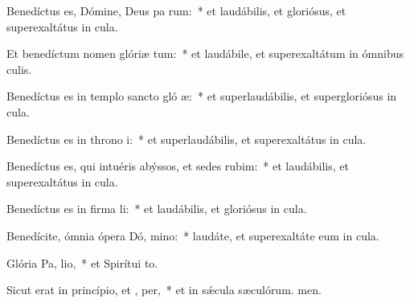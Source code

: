 \item Benedíctus es, Dómine, Deus pa rum:~* et laudábilis, et gloriósus, et superexaltátus in cula.

\item Et benedíctum nomen glóriæ  tum:~* et laudábile, et superexaltátum in ómnibus culis.

\item Benedíctus es in templo sancto gló æ:~* et superlaudábilis, et supergloriósus in cula.

\item Benedíctus es in throno  i:~* et superlaudábilis, et superexaltátus in cula.

\item Benedíctus es, qui intuéris abýssos, et sedes  rubim:~* et laudábilis, et superexaltátus in cula.

\item Benedíctus es in firma li:~* et laudábilis, et gloriósus in cula.

\item Benedícite, ómnia ópera Dó, mino:~* laudáte, et superexaltáte eum in cula.

\item Glória Pa,  lio,~* et Spirítui to.

\item Sicut erat in princípio, et ,  per,~* et in sǽcula sæculórum. men.